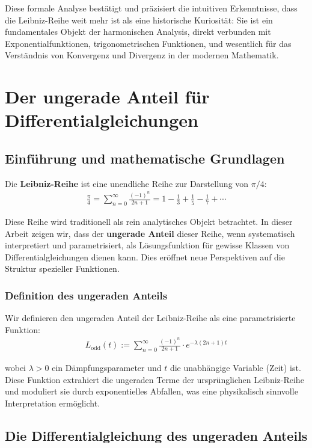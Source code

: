 \documentclass[a4paper, 12pt, twoside, openright]{report}
\theoremstyle{definition}
\theoremstyle{definition}
\begin{document}
Diese formale Analyse bestätigt und präzisiert die intuitiven Erkenntnisse, dass die Leibniz-Reihe weit mehr ist als eine historische Kuriosität: Sie ist ein fundamentales Objekt der harmonischen Analysis, direkt verbunden mit Exponentialfunktionen, trigonometrischen Funktionen, und wesentlich für das Verständnis von Konvergenz und Divergenz in der modernen Mathematik.

\section{Der ungerade Anteil für Differentialgleichungen}

\subsection{Einführung und mathematische Grundlagen}

Die \textbf{Leibniz-Reihe} ist eine unendliche Reihe zur Darstellung von $\pi/4$:
\begin{align}
	\frac{\pi}{4} = \sum_{n=0}^{\infty} \frac{(-1)^n}{2n+1} = 1 - \frac{1}{3} + \frac{1}{5} - \frac{1}{7} + \cdots
\end{align}

Diese Reihe wird traditionell als rein analytisches Objekt betrachtet. In dieser Arbeit zeigen wir, dass der \textbf{ungerade Anteil} dieser Reihe, wenn systematisch interpretiert und parametrisiert, als Lösungsfunktion für gewisse Klassen von Differentialgleichungen dienen kann. Dies eröffnet neue Perspektiven auf die Struktur spezieller Funktionen.

\subsubsection*{Definition des ungeraden Anteils}

Wir definieren den ungeraden Anteil der Leibniz-Reihe als eine parametrisierte Funktion:
\begin{align}
	L_{\text{odd}}(t) := \sum_{n=0}^{\infty} \frac{(-1)^n}{2n+1} \cdot e^{-\lambda(2n+1)t}
\end{align}

wobei $\lambda > 0$ ein Dämpfungsparameter und $t$ die unabhängige Variable (Zeit) ist. Diese Funktion extrahiert die ungeraden Terme der ursprünglichen Leibniz-Reihe und moduliert sie durch exponentielles Abfallen, was eine physikalisch sinnvolle Interpretation ermöglicht.

\subsection{Die Differentialgleichung des ungeraden Anteils}
\end{document}
